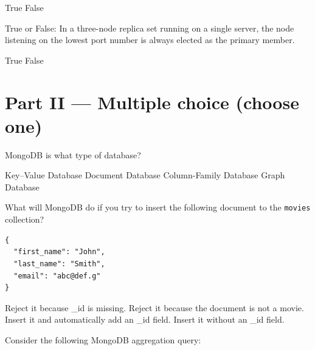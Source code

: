 \documentclass[12pt,answers]{exam}
\begin{document}
\begin{questions}
\begin{minipage}{\linewidth}
\begin{checkboxes}
    \CorrectChoice True
    \choice False
\end{checkboxes}
\end{minipage}

\begin{minipage}{\linewidth}
\question[2]
True or False: In a three-node replica set running on a single server, 
the node listening on the lowest port number is always elected as the primary member.

\begin{checkboxes}
    \choice True
    \CorrectChoice False
\end{checkboxes}
\end{minipage}






\section*{Part II — Multiple choice (choose one)}

\begin{minipage}{\linewidth}
\question[2]
MongoDB is what type of database?

\begin{checkboxes}
    \choice Key–Value Database
    \CorrectChoice Document Database
    \choice Column-Family Database
    \choice Graph Database
\end{checkboxes}
\end{minipage}


\begin{minipage}{\linewidth}
\question[2]
What will MongoDB do if you try to insert the following document to the \texttt{movies} collection?
\begin{verbatim}
{
  "first_name": "John",
  "last_name": "Smith",
  "email": "abc@def.g"
}
\end{verbatim}

\begin{checkboxes}
    \choice Reject it because \_id is missing.
    \choice Reject it because the document is not a movie.
    \CorrectChoice Insert it and automatically add an \_id field.
    \choice Insert it without an \_id field.
\end{checkboxes}
\end{minipage}




\begin{minipage}{\linewidth}
\question[4]
Consider the following MongoDB aggregation query:


\end{minipage}
\end{questions}
\end{document}
